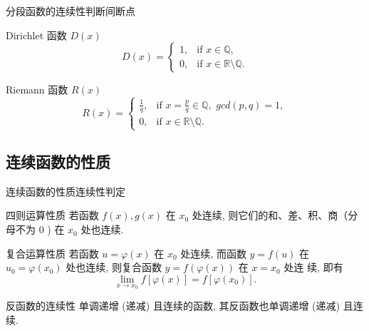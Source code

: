 \documentclass[
10pt,
aspectratio=43,
]{beamer}
\begin{document}
				\begin{frame}{分段函数的连续性}{判断间断点}
					\begin{exampleblock}{Dirichlet 函数 $D(x)$}
						\[
							D(x) = \begin{cases}
							1, & \text{if } x \in \mathbb{Q}, \\
							0, & \text{if } x \in \mathbb{R} \setminus \mathbb{Q}.
							\end{cases}
						\]
						
					\end{exampleblock}
					\pause
					\begin{exampleblock}{Riemann 函数 $R(x)$}
						\[
							R(x) = \begin{cases}
							\displaystyle\frac1q, & \text{if } x = \displaystyle\frac{p}{q}\in \mathbb{Q},\,\,gcd(p,q)=1, \\
							0, & \text{if } x \in \mathbb{R} \setminus \mathbb{Q}.
							\end{cases}
						\]
						
					\end{exampleblock}
					
				\end{frame}
				
				
					
				
				
				\subsection{连续函数的性质}
				
				\begin{frame}{连续函数的性质}{连续性判定}
					\begin{exampleblock}{四则运算性质}
						若函数 $f(x), g(x)$ 在 $x_0$ 处连续, 则它们的和、差、积、商（分 母不为 0 ) 在 $x_0$ 处也连续.
					\end{exampleblock}
					\pause
					\begin{exampleblock}{复合运算性质}
						若函数 $u=\varphi(x)$ 在 $x_0$ 处连续, 而函数 $y=f(u)$ 在 $u_0=\varphi\left(x_0\right)$ 处也连续, 则复合函数 $y=f(\varphi(x))$ 在 $x=x_0$ 处连 续, 即有 
						$$\lim _{x \rightarrow x_0} f[\varphi(x)]=f\left[\varphi\left(x_0\right)\right].$$
					\end{exampleblock}
					\pause
					\begin{exampleblock}{反函数的连续性}
						单调递增 (递减) 且连续的函数, 其反函数也单调递增 (递减) 且连续.
					\end{exampleblock}
				\end{frame}
				
\end{document}
